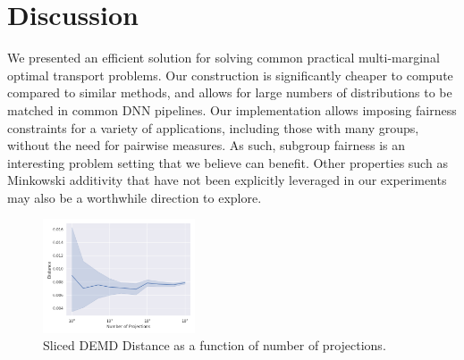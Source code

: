 \vspace{-10pt}
\section{Discussion}
\vspace{-10pt}
We presented an efficient solution for solving common practical multi-marginal optimal transport problems.
Our construction is significantly cheaper to compute compared to similar methods,
and allows for large numbers of distributions to be matched in common DNN pipelines. 
Our implementation allows imposing fairness constraints for a variety of applications, including those with many groups, without the need for pairwise measures.
As such, subgroup fairness \citep{kearns2018preventing} is an interesting problem setting that we believe can benefit.
Other properties such as 
Minkowski additivity that have not been 
explicitly leveraged in our experiments may also be a worthwhile direction to explore.
\begin{figure}
    \centering
    \includegraphics[width=0.4\textwidth]{6_demd/figs/sliced/demd_multidim_proj_convergence_CelebA.png}
    \caption{Sliced DEMD Distance as a function of number of projections.}
    \label{fig:sliced}
\end{figure}

